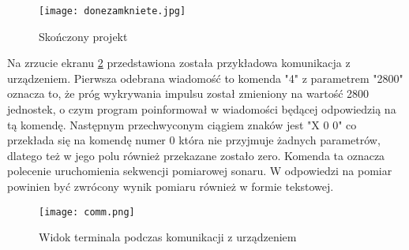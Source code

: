 \begin{figure}[ht!]
    \centering
    \texttt{[image: donezamkniete.jpg]}
    \caption{Skończony projekt}
    \label{fig:done}
\end{figure}

Na zrzucie ekranu \ref{fig:comm} przedstawiona została przykładowa komunikacja z urządzeniem. 
Pierwsza odebrana wiadomość to komenda "4" z parametrem "2800" oznacza to, 
że próg wykrywania impulsu został zmieniony na wartość 2800 jednostek, o czym program poinformował w wiadomości będącej odpowiedzią na tą komendę.
Następnym przechwyconym ciągiem znaków jest "X 0 0" co przekłada się na komendę numer 0 która nie przyjmuje żadnych parametrów, dlatego też w jego polu również przekazane zostało zero.
Komenda ta oznacza polecenie uruchomienia sekwencji pomiarowej sonaru. W odpowiedzi na pomiar powinien być zwrócony wynik pomiaru również w formie tekstowej.
\begin{figure}[ht!]
    \centering
    \texttt{[image: comm.png]}
    \caption{Widok terminala podczas komunikacji z urządzeniem }
    \label{fig:comm}
\end{figure}